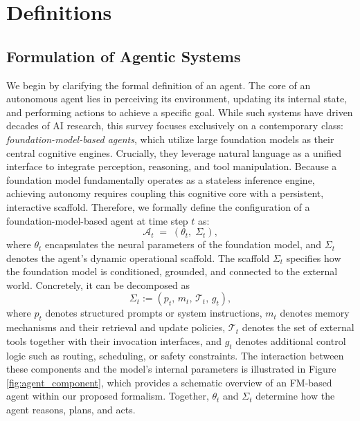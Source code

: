 \section{Definitions}
\label{sec:Definitions}

\subsection{Formulation of Agentic Systems}
\label{subsec:Foundation_Model_Based_Agents}


We begin by clarifying the formal definition of an agent. The core of an autonomous agent lies in perceiving its environment, updating its internal state, and performing actions to achieve a specific goal. While such systems have driven decades of AI research, this survey focuses exclusively on a contemporary class: \textit{foundation-model-based agents}, which utilize large foundation models as their central cognitive engines. Crucially, they leverage natural language as a unified interface to integrate perception, reasoning, and tool manipulation. Because a foundation model fundamentally operates as a stateless inference engine, achieving autonomy requires coupling this cognitive core with a persistent, interactive scaffold. Therefore, we formally define the configuration of a foundation-model-based agent at time step $t$ as:
\begin{equation}
\label{eq:agent_formalism}
\mathcal{A}_t \;=\; (\theta_t,\; \Sigma_t),
\end{equation}
where $\theta_t$ encapsulates the neural parameters of the foundation model, and $\Sigma_t$ denotes the agent's dynamic operational scaffold. The scaffold $\Sigma_t$ specifies how the foundation model is conditioned, grounded, and connected to the external world. Concretely, it can be decomposed as
\begin{equation}
\label{eq:scaffold_formalism}
\Sigma_t := (p_t,\, m_t,\, \mathcal{T}_t,\, g_t),
\end{equation}
where $p_t$ denotes structured prompts or system instructions, $m_t$ denotes memory mechanisms and their retrieval and update policies, 
$\mathcal{T}_t$ denotes the set of external tools together with their invocation interfaces, and 
$g_t$ denotes additional control logic such as routing, scheduling, or safety constraints. The interaction between these components and the model's internal parameters is illustrated in Figure \ref{fig:agent_component}, which provides a schematic overview of an FM-based agent within our proposed formalism. Together, 
$\theta_t$ and $\Sigma_t$ determine how the agent reasons, plans, and acts.


